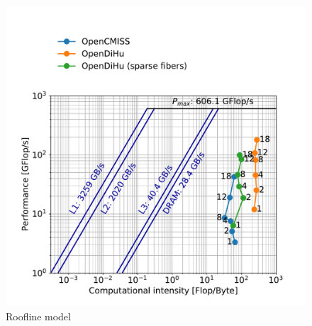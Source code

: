 \begin{figure}[H]
  \centering%
  \includegraphics[width=\textwidth]{images/results/studies/0_roofline.pdf}%
  \caption{Roofline model}%
  \label{fig:roofline}%
\end{figure}%

